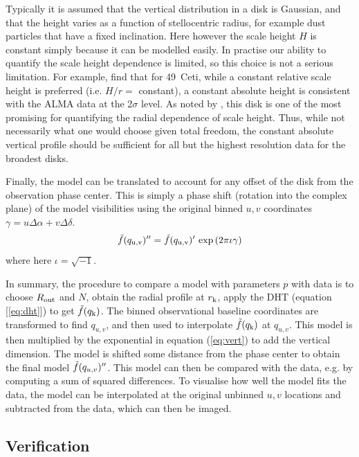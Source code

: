 \documentclass[fleqn,usenatbib]{mnras}
\begin{document}
Typically it is assumed that the  vertical distribution in a disk is Gaussian, and that the height varies as a function of stellocentric radius, for example dust particles that have a fixed inclination. Here however the scale height $H$ is constant simply because it can be modelled easily. In practise our ability to quantify the scale height dependence is limited, so this choice is not a serious limitation. For example, \citet{2023MNRAS.524.1229T} find that for 49~Ceti, while a constant relative scale height is preferred (i.e. $H/r=$ constant), a constant absolute height is consistent with the ALMA data at the 2$\sigma$ level. As noted by \citet{2023MNRAS.524.1229T}, this disk is one of the most promising for quantifying the radial dependence of scale height. Thus, while not necessarily what one would choose given total freedom, the constant absolute vertical profile should be sufficient for all but the highest resolution data for the broadest disks.

Finally, the model can be translated to account for any offset of the disk from the observation phase center. This is simply a phase shift (rotation into the complex plane) of the model visibilities using the original binned $u,v$ coordinates $\gamma = u \Delta \alpha + v \Delta \delta$.
\begin{equation}\label{eq:phase}
    \Tilde{f}(q_{\rm u,v})'' = \Tilde{f}(q_{\rm u,v})' \, \exp{(2 \pi \iota \gamma)}
\end{equation}
where here $\iota = \sqrt{-1}$.

In summary, the procedure to compare a model with parameters $p$ with data is to choose $R_{\rm out}$ and $N$, obtain the radial profile at $r_{\rm k}$, apply the DHT (equation [\ref{eq:dht}]) to get $\Tilde{f}(q_{\rm k})$. The binned observational baseline coordinates are transformed to find $q_{u,v}$, and then used to interpolate $\Tilde{f}(q_{\rm k})$ at $q_{u,v}$. This model is then multiplied by the exponential in equation (\ref{eq:vert}) to add the vertical dimension. The model is shifted some distance from the phase center to obtain the final model $\Tilde{f}(q_{u,v})''$. This model can then be compared with the data, e.g. by computing a sum of squared differences. To visualise how well the model fits the data, the model can be interpolated at the original unbinned $u,v$ locations and subtracted from the data, which can then be imaged.

\subsection{Verification}
\end{document}
